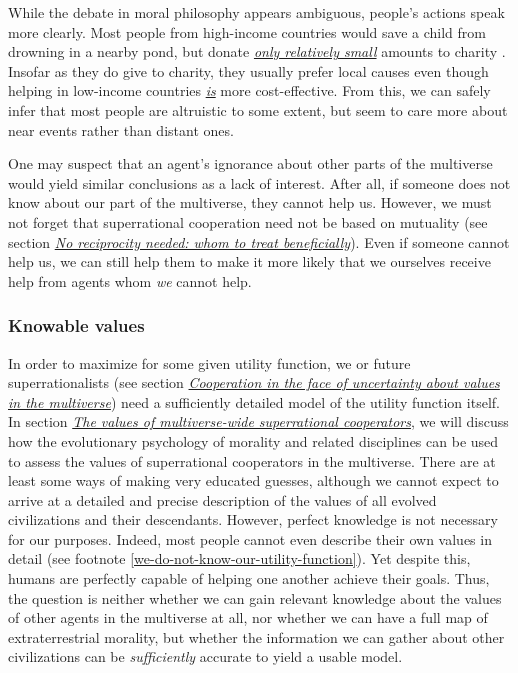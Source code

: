 While the debate in moral philosophy appears ambiguous, people's actions
speak more clearly. Most people from high-income countries would save a
child from drowning in a nearby pond, but donate
\href{http://nccs.urban.org/nccs/statistics/charitable-giving-in-america-some-facts-and-figures.cfm}{\emph{only
relatively small}} amounts to charity
\parencite{Singer1972-uk}. Insofar as they do give to
charity, they usually prefer local causes even though helping in
low-income countries
\href{http://www.givewell.org/giving101/Your-dollar-goes-further-overseas}{\emph{is}}
more cost-effective. From this, we can safely infer that most people are
altruistic to some extent, but seem to care more about near events
rather than distant ones.

One may suspect that an agent's ignorance about other parts of the
multiverse would yield similar conclusions as a lack of interest. After
all, if someone does not know about our part of the multiverse, they
cannot help us. However, we must not forget that superrational
cooperation need not be based on mutuality (see section
\protect\hyperlink{no-reciprocity-needed-whom-to-treat-beneficially}{\emph{No
reciprocity needed: whom to treat beneficially}}). Even if someone
cannot help us, we can still help them to make it more likely that we
ourselves receive help from agents whom \emph{we} cannot help.

\subsubsection{Knowable values}\label{knowable-values}

In order to maximize for some given utility function, we or future
superrationalists (see section
\protect\hyperlink{cooperation-in-the-face-of-uncertainty-about-values}{\emph{Cooperation
in the face of uncertainty about values in the multiverse}}) need a
sufficiently detailed model of the utility function itself. In section
\protect\hyperlink{_sm02dccw7h9m}{\emph{The values of multiverse-wide
superrational cooperators}}, we will discuss how the evolutionary
psychology of morality and related disciplines can be used to assess the
values of superrational cooperators in the multiverse. There are at
least some ways of making very educated guesses, although we cannot
expect to arrive at a detailed and precise description of the values of
all evolved civilizations and their descendants. However, perfect
knowledge is not necessary for our purposes. Indeed, most people cannot
even describe their own values in detail (see footnote
\ref{we-do-not-know-our-utility-function}). Yet despite
this, humans are perfectly capable of helping one another achieve their
goals. Thus, the question is neither whether we can gain relevant
knowledge about the values of other agents in the multiverse at all, nor
whether we can have a full map of extraterrestrial morality, but whether
the information we can gather about other civilizations can be
\emph{sufficiently} accurate to yield a usable model.

